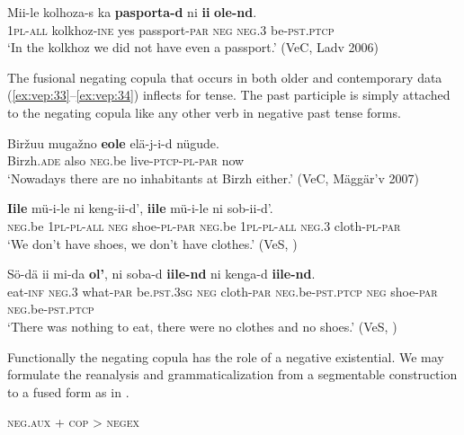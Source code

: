 \documentclass[output=paper,colorlinks=true, citecolor=brown]{langscibook}
\begin{document}
\ea
    \label{ex:vep:32}
    \gll  Mii-le kolhoza-s ka \textbf{pasporta-d}  ni \textbf{ii} \textbf{ole-nd}.\\
         \textsc{1pl-all} kolkhoz{}-\textsc{ine} yes passport-\textsc{par} \textsc{neg} \textsc{neg.3} be-\textsc{pst.ptcp}\\
    \glt ‘In the kolkhoz we did not have even a passport.’ (VeC, Ladv 2006)
\z

The fusional negating copula that occurs in both older and contemporary data (\ref{ex:vep:33}–\ref{ex:vep:34}) inflects for tense. The past participle is simply attached to the negating copula  like any other verb in negative past tense forms.

\ea
    \label{ex:vep:33}
    \gll Biržuu mugažno \textbf{eole} elä-j-i-d  nügude. \\
         Birzh.\textsc{ade} also \textsc{neg}.be live-\textsc{ptcp}{}-\textsc{pl}{}-\textsc{par} now\\
    \glt ‘Nowadays there are no inhabitants at Birzh either.’ (VeC, Mäggär’v 2007)
\z

\ea
    \label{ex:vep:34}
    \gll \textbf{Iile} mü{}-i-le ni keng-ii-d’, \textbf{iile} mü-i-le ni sob-ii-d’.\\
         \textsc{neg}.be \textsc{1pl-pl-all} \textsc{neg} shoe-\textsc{pl-par} \textsc{neg}.be \textsc{1pl-pl-all} \textsc{neg.3} cloth-\textsc{pl-par}\\
    \glt ‘We don’t have shoes, we don’t have clothes.’ (VeS, \citealt[105]{Kettunen1925})
\z 

\ea
    \label{ex:vep:35}
    \gll Sö-dä ii mi-da \textbf{ol’}, ni soba-d  \textbf{iile-nd}  ni kenga{}-d \textbf{iile-nd}. \\
         eat\textsc{-inf} \textsc{neg.3} what-\textsc{par} be.\textsc{pst.3sg} \textsc{neg} cloth-\textsc{par}  \textsc{neg}.be-\textsc{pst.ptcp} \textsc{neg} shoe-\textsc{par} \textsc{neg}.be-\textsc{pst.ptcp}\\
    \glt ‘There was nothing to eat, there were no clothes and no shoes.’ (VeS, \citealt[56]{Kettunen1920})
\z

Functionally the negating copula has the role of a negative existential. We may formulate the reanalysis and grammaticalization from a segmentable construction to a fused form as in . 

\ea\label{ex:vep:35b}
\textsc{neg}.\textsc{aux} + \textsc{cop} > \textsc{negex}
\z 
\end{document}
